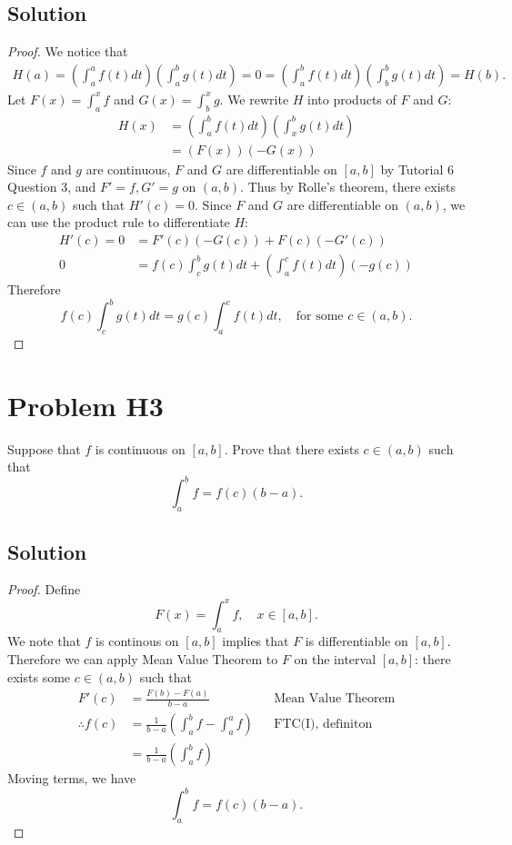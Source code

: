 \documentclass{article}
\theoremstyle{plain}
\newcommand{\bigint}{\displaystyle\int}
\begin{document}
\subsection*{Solution}
\begin{proof}
We notice that
\begin{align*}
H(a)=\left(\int_{a}^{a}f(t)dt\right)\left(\int_{a}^{b}g(t)dt\right)=0=
\left(\int_{a}^{b}f(t)dt\right)\left(\int_{b}^{b}g(t)dt\right)=H(b).
\end{align*}
Let $F(x)=\bigint_{a}^{x}f$ and $G(x)=\bigint_{b}^{x}g$. We rewrite $H$ into
products of $F$ and $G$:
\begin{align*}
H(x)&=\left(\int_{a}^{b}f(t)dt\right)\left(\int_{x}^{b}g(t)dt\right)\\
  &=(F(x))(-G(x))
\end{align*}
Since $f$ and $g$ are continuous, $F$ and $G$ are differentiable on $[a,b]$ by
Tutorial 6 Question 3, and $F'=f, G'=g$ on $(a,b)$. Thus by Rolle's theorem,
there exists $c\in(a,b)$ such that $H'(c)=0$. Since $F$ and $G$ are differentiable
on $(a,b)$, we can use the product rule to differentiate $H$:
\begin{align*}
  H'(c)=0&=F'(c)(-G(c))+F(c)(-G'(c))\\
  0&=f(c)\int_{c}^{b}g(t)dt+\left(\int_{a}^{c}f(t)dt\right)(-g(c))
\end{align*}
Therefore
\[f(c)\int_{c}^{b}g(t)dt=g(c)\int_{a}^{c}f(t)dt,\quad \text{for some }c\in(a,b).\]
\end{proof}

\section*{Problem H3}
Suppose that $f$ is continuous on $[a,b]$. Prove that there exists $c\in(a,b)$
such that \[\int_{a}^{b}f=f(c)(b-a).\]
\subsection*{Solution}
\begin{proof}
  Define \[F(x)=\int_{a}^{x}f,\quad x\in[a,b].\]We note that $f$ is continous on $[a,b]$
  implies that $F$ is differentiable on $[a,b]$. Therefore we can apply Mean
  Value Theorem to $F$ on the interval $[a,b]$: there exists some $c\in(a,b)$ such
  that
  \begin{align*}
    F'(c)&=\frac{F(b)-F(a)}{b-a}&&\text{Mean Value Theorem}\\
    \therefore f(c)&=\frac{1}{b-a}\left(\int_{a}^{b}f-\int_{a}^{a}f\right) &&\text{FTC(I), definiton}\\
    &=\frac{1}{b-a}\left(\int_{a}^{b}f\right)
  \end{align*}
  Moving terms, we have \[\int_{a}^{b}f=f(c)(b-a).\]
\end{proof}
\end{document}
